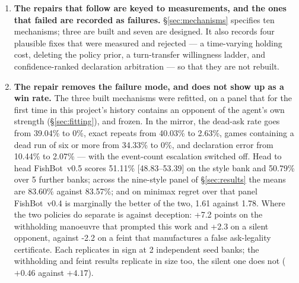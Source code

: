 \documentclass[11pt]{article}
\theoremstyle{definition}
\DeclareRobustCommand{\vfive}{\texorpdfstring{\mbox{FishBot v0.5}}{FishBot v0.5}}
\DeclareRobustCommand{\vfour}{\texorpdfstring{\mbox{FishBot v0.4}}{FishBot v0.4}}
\providecommand{\numStageTwoCost}{8.13}
\providecommand{\numFourDeadAsk}{39.04}
\providecommand{\numFourDeadRunGames}{34.33}
\providecommand{\numFourDeclWrong}{10.44}
\providecommand{\numFourRepeatAsk}{40.03}
\providecommand{\numFiveRepeatAsk}{2.63}
\providecommand{\numFiveDeadAsk}{0}
\providecommand{\numFiveDeadRunGames}{0}
\providecommand{\numFiveDeclWrong}{2.07}
\providecommand{\numHeadWin}{50.79}
\providecommand{\numHeadSeeds}{5}
\providecommand{\numStyleCIVfour}{48.83--53.39}
\providecommand{\numPanelVfiveVfour}{51.11}
\providecommand{\numVfiveMean}{83.60}
\providecommand{\numVfourMean}{83.57}
\providecommand{\numVfiveRegret}{1.78}
\providecommand{\numVfourRegret}{1.61}
\providecommand{\numDecSeeds}{2}
\providecommand{\numDecSilentDelta}{+2.3}
\providecommand{\numDecFeintDelta}{-2.2}
\providecommand{\numDecWithholderDelta}{+7.2}
\providecommand{\numDecSilentDeltaA}{+0.46}
\providecommand{\numDecSilentDeltaB}{+4.17}
\begin{document}
\begin{enumerate}
        cashes a best candidate without inspecting its probability at all, costs
        \numStageTwoCost{} points against a mirror opponent and exactly nothing
        against every weaker style tested. Both settings of the dial are bad; the
        missing capability is an ask rule that terminates the cycle by choosing
        informative asks rather than an event counter that ends the game by
        guessing.
  \item \textbf{The repairs that follow are keyed to measurements, and the ones
        that failed are recorded as failures.} \S\ref{sec:mechanisms} specifies
        ten mechanisms; three are built and seven are designed. It also records
        four plausible fixes that were measured and rejected --- a time-varying
        holding cost, deleting the policy prior, a turn-transfer willingness
        ladder, and confidence-ranked declaration arbitration --- so that they
        are not rebuilt.
  \item \textbf{The repair removes the failure mode, and does not show up as a
        win rate.} The three built mechanisms were refitted, on a panel that for
        the first time in this project's history contains an opponent of the
        agent's own strength (\S\ref{sec:fitting}), and frozen. In the mirror,
        the dead-ask rate goes from \numFourDeadAsk\% to \numFiveDeadAsk\%, exact
        repeats from \numFourRepeatAsk\% to \numFiveRepeatAsk\%, games containing
        a dead run of six or more from \numFourDeadRunGames\% to
        \numFiveDeadRunGames\%, and declaration error from \numFourDeclWrong\% to
        \numFiveDeclWrong\% --- with the event-count escalation switched off.
        Head to head \vfive{} scores
        \numPanelVfiveVfour\% [\numStyleCIVfour] on the style bank and
        \numHeadWin\% over \numHeadSeeds{} further banks; across the nine-style panel of
        \S\ref{sec:results} the means are \numVfiveMean\% against
        \numVfourMean\%; and on minimax regret over that panel \vfour{} is
        marginally the better of the two, \numVfourRegret{} against
        \numVfiveRegret{}. Where the two policies do separate is against
        deception: \numDecWithholderDelta{} points on the withholding manoeuvre
        that prompted this work and \numDecSilentDelta{} on a silent opponent,
        against \numDecFeintDelta{} on a feint that manufactures a false
        ask-legality certificate. Each replicates in sign at \numDecSeeds{}
        independent seed banks; the withholding and feint results replicate in
        size too, the silent one does not ($\numDecSilentDeltaA$ against
        $\numDecSilentDeltaB$).
\end{enumerate}
\end{document}
